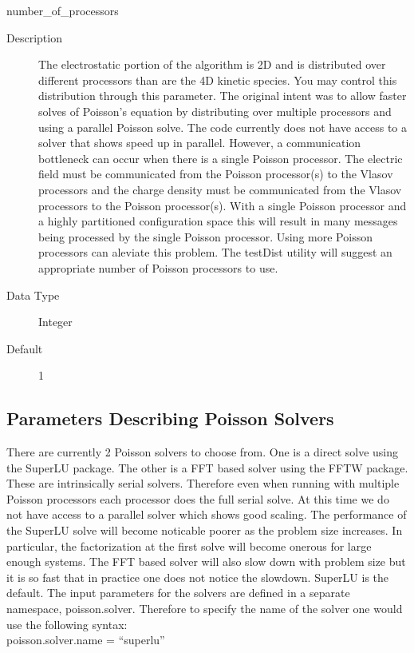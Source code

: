 \documentclass[11pt]{amsart}
\begin{document}
number\_of\_processors
\begin{description}
\item [Description] The electrostatic portion of the algorithm is 2D and is
distributed over different processors than are the 4D kinetic species.  You
may control this distribution through this parameter.  The original intent was
to allow faster solves of Poisson's equation by distributing over multiple
processors and using a parallel Poisson solve.  The code currently does not
have access to a solver that shows speed up in parallel.  However, a
communication bottleneck can occur when there is a single Poisson processor.
The electric field must be communicated from the Poisson processor(s) to the
Vlasov processors and the charge density must be communicated from the Vlasov
processors to the Poisson processor(s).  With a single Poisson processor and a
highly partitioned configuration space this will result in many messages being
processed by the single Poisson processor.  Using more Poisson processors can
aleviate this problem.  The testDist utility will suggest an appropriate number
of Poisson processors to use.
\item [Data Type] Integer
\item [Default] 1
\end{description}

\subsection*{Parameters Describing Poisson Solvers}
There are currently 2 Poisson solvers to choose from.  One is a direct solve
using the SuperLU package.  The other is a FFT based solver using the FFTW
package.  These are intrinsically serial solvers.  Therefore even when running
with multiple Poisson processors each processor does the full serial solve.  At
this time we do not have access to a parallel solver which shows good scaling.
The performance of the SuperLU solve will become noticable poorer as the
problem size increases.  In particular, the factorization at the first solve
will become onerous for large enough systems.  The FFT based solver will also
slow down with problem size but it is so fast that in practice one does not
notice the slowdown.  SuperLU is the default.  The input parameters for the
solvers are defined in a separate namespace, poisson.solver.  Therefore to
specify the name of the solver one would use the following syntax: \\
poisson.solver.name = ``superlu''
\end{document}
